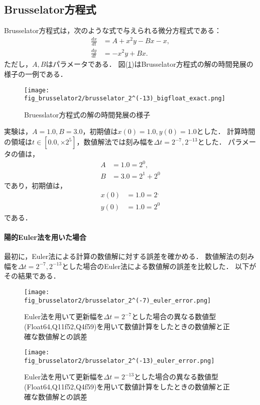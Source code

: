 \subsection{Brusselator方程式}
Brusselator方程式は，次のような式で与えられる微分方程式である：
\begin{align}
    \frac{dx}{dt} &= A + x^2y - Bx - x,\\
    \frac{dy}{dt} &= -x^2y + Bx.
\end{align}
ただし，$A,B$はパラメータである．
図(\ref{fig:brusselator})はBrusselator方程式の解の時間発展の様子の一例である．
\begin{figure}[H]
    \centering
    \begin{minipage}[b]{0.9\columnwidth}
            \texttt{[image: fig\_brusselator2/brusselator\_2^(-13)\_bigfloat\_exact.png]}
    \end{minipage}
    \caption{Bruesslator方程式の解の時間発展の様子}
    \label{fig:brusselator}
\end{figure}
実験は，$A=1.0, B=3.0$，初期値は$x(0) = 1.0, y(0) = 1.0$とした．
計算時間の領域は$t \in [0.0, \times 2^5]$，数値解法では刻み幅を$\Delta t =  2^{-7}, 2^{-13}$とした．
パラメータの値は，
\begin{align}
    A &= 1.0 = 2^0, \\
    B &= 3.0 = 2^1 + 2^0
\end{align}
であり，初期値は，
\begin{align}
    x(0) &= 1.0 = 2^, \\
    y(0) &= 1.0 = 2^0
\end{align} 
である．
\paragraph*{陽的Euler法を用いた場合}
最初に，Euler法による計算の数値解に対する誤差を確かめる．
数値解法の刻み幅を$\Delta t = 2^{-7},2^{-13}$とした場合のEuler法による数値解の誤差を比較した．
以下がその結果である．
\begin{figure}[H]
    \centering
    \begin{minipage}[b]{0.49\columnwidth}
        \centering
        \texttt{[image: fig\_brusselator2/brusselator\_2^(-7)\_euler\_error.png]}
        \caption{Euler法を用いて更新幅を$\Delta t = 2^{-7}$とした場合の異なる数値型(Float64,Q11f52,Q4f59)を用いて数値計算をしたときの数値解と正確な数値解との誤差}
        \label{fig:brusselator_2^(-7)_euler_error}
    \end{minipage}
    \begin{minipage}[b]{0.49\columnwidth}
        \centering
        \texttt{[image: fig\_brusselator2/brusselator\_2^(-13)\_euler\_error.png]}
        \caption{Euler法を用いて更新幅を$\Delta t =  2^{-13}$とした場合の異なる数値型(Float64,Q11f52,Q4f59)を用いて数値計算をしたときの数値解と正確な数値解との誤差}
        \label{fig:brusselator_2^(-13)_euler_error}
    \end{minipage}
\end{figure}

